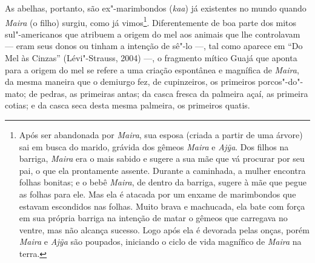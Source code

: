 As abelhas, portanto, são ex"-marimbondos (\emph{kaa}) já existentes no
mundo quando \emph{Maira} (o filho) surgiu, como já vimos\footnote{Após
  ser abandonada por \emph{Maira}, sua esposa (criada a partir de uma
  árvore) sai em busca do marido, grávida dos gêmeos \emph{Maira} e
  \emph{Ajỹa}. Dos filhos na barriga, \emph{Maira} era o mais sabido e
  sugere a sua mãe que vá procurar por seu pai, o que ela prontamente
  assente. Durante a caminhada, a mulher encontra folhas bonitas; e o
  bebê \emph{Maira}, de dentro da barriga, sugere à mãe que pegue as
  folhas para ele. Mas ela é atacada por um enxame de marimbondos que
  estavam escondidos nas folhas. Muito brava e machucada, ela bate com
  força em sua própria barriga na intenção de matar o gêmeos que
  carregava no ventre, mas não alcança sucesso. Logo após ela é devorada
  pelas onças, porém \emph{Maira} e \emph{Ajỹa} são poupados, iniciando
  o ciclo de vida magnífico de \emph{Maira} na terra.}. Diferentemente
de boa parte dos mitos sul"-americanos que atribuem a origem do mel aos
animais que lhe controlavam --- eram seus donos ou tinham a intenção de
sê"-lo ---, tal como aparece em ``Do Mel às Cinzas'' (Lévi"-Strauss, 2004) ---, o
fragmento mítico Guajá que aponta para a origem do mel se refere a uma
criação espontânea e magnífica de \emph{Maira}, da mesma maneira que o
demiurgo fez, de cupinzeiros, os primeiros porcos"-do"-mato; de pedras, as
primeiras antas; da casca fresca da palmeira açaí, as primeira cotias; e
da casca seca desta mesma palmeira, os primeiros quatis.

